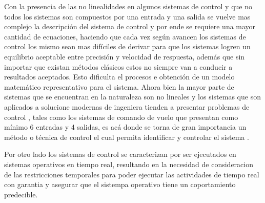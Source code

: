 \documentclass[12pt]{article}
\begin{document}
Con la presencia de las no linealidades en algunos sistemas de control y que no todos los sistemas son compuestos por una entrada y una salida se vuelve mas complejo la descripción del sistema  de control y por ende se requiere una mayor cantidad de ecuaciones, haciendo que cada vez según avancen los sistemas de control los mismo sean mas difíciles de derivar para que los sistemas logren un equilibrio aceptable entre precisión y velocidad de respuesta, además que sin importar que existan métodos clásicos estos no siempre van a conducir a resultados aceptados. Esto dificulta el procesos e obtención de un modelo matemático representativo para el sistema. Ahora bien la mayor parte de sistemas que se encuentran en la naturaleza son no lineales y los sistemas que son aplicados a solucione modernas de ingeniera tienden a presentar problemas de control , tales como los sistemas de comando de vuelo que presentan como mínimo 6 entradas y 4 salidas, es acá donde se torna de gran importancia un método o técnica de control el cual permita identificar y controlar el sistema \cite{15-tec}. 


Por otro lado los sistemas de control se caracterizan por ser ejecutados en sistemas operativos en tiempo real, resultando en la necesidad de consideracion de las restricciones temporales para poder ejecutar las actividades de tiempo real con garantia y asegurar que el sistempa operativo tiene un coportamiento predecible. 



\end{document}
